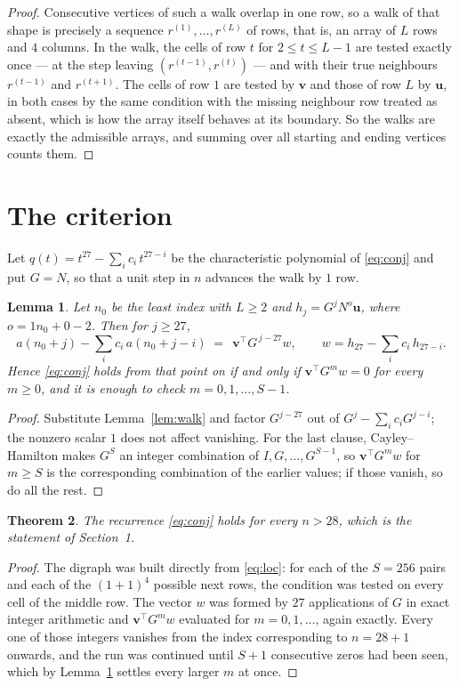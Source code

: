 \documentclass[11pt,a4paper]{article}
\theoremstyle{plain}
\newtheorem{theorem}{Theorem}
\newtheorem{lemma}[theorem]{Lemma}
\theoremstyle{definition}
\begin{document}
\begin{proof}
Consecutive vertices of such a walk overlap in one row, so a walk of that shape is
precisely a sequence $r^{(1)},\dots,r^{(L)}$ of rows, that is, an array of $L$ rows
and $4$ columns. In the walk, the cells of row $t$ for $2\le t\le L-1$ are tested
exactly once --- at the step leaving $(r^{(t-1)},r^{(t)})$ --- and with their true
neighbours $r^{(t-1)}$ and $r^{(t+1)}$. The cells of row $1$ are tested by
$\mathbf{v}$ and those of row $L$ by $\mathbf{u}$, in both cases by the same condition
with the missing neighbour row treated as absent, which is how the array itself behaves at
its boundary. So the walks are exactly the admissible arrays, and summing over all starting
and ending vertices counts them.
\end{proof}

\section{The criterion}

Let $q(t)=t^{27}-\sum_i c_i\,t^{27-i}$ be the characteristic polynomial of
\eqref{eq:conj} and put $G=N$, so that a unit step in $n$ advances the walk by
$1$ row.

\begin{lemma}\label{lem:crit}
Let $n_0$ be the least index with $L\ge2$ and $h_j=G^{j}N^{o}\mathbf{u}$, where
$o=1n_0+0-2$. Then for $j\ge27$,
\[
a(n_0+j)-\sum_i c_i\,a(n_0+j-i)\;=\;\,\mathbf{v}^{\!\top}G^{\,j-27}w,
\qquad w=h_{27}-\sum_i c_i\,h_{27-i} .
\]
Hence \eqref{eq:conj} holds from that point on if and only if
$\mathbf{v}^{\!\top}G^{m}w=0$ for every $m\ge0$, and it is enough to check
$m=0,1,\dots,S-1$.
\end{lemma}

\begin{proof}
Substitute Lemma~\ref{lem:walk} and factor $G^{j-27}$ out of
$G^{j}-\sum_ic_iG^{j-i}$; the nonzero scalar $1$ does not affect
vanishing. For the last clause, Cayley--Hamilton makes $G^{S}$ an integer combination of
$I,G,\dots,G^{S-1}$, so $\mathbf{v}^{\!\top}G^{m}w$ for $m\ge S$ is the corresponding
combination of the earlier values; if those vanish, so do all the rest.
\end{proof}

\begin{theorem}
The recurrence \eqref{eq:conj} holds for every $n>28$, which is the statement of
Section~1.
\end{theorem}

\begin{proof}
The digraph was built directly from \eqref{eq:loc}: for each of the $S=256$ pairs and each
of the $(1+1)^{4}$ possible next rows, the condition was tested on every cell of
the middle row. The vector $w$ was formed by $27$ applications of $G$ in exact integer
arithmetic and $\mathbf{v}^{\!\top}G^{m}w$ evaluated for $m=0,1,\dots$, again exactly.
Every one of those integers vanishes from the index corresponding to $n=28+1$ onwards,
and the run was continued until $S+1$ consecutive zeros had been seen, which by
Lemma~\ref{lem:crit} settles every larger $m$ at once.
\end{proof}
\end{document}
